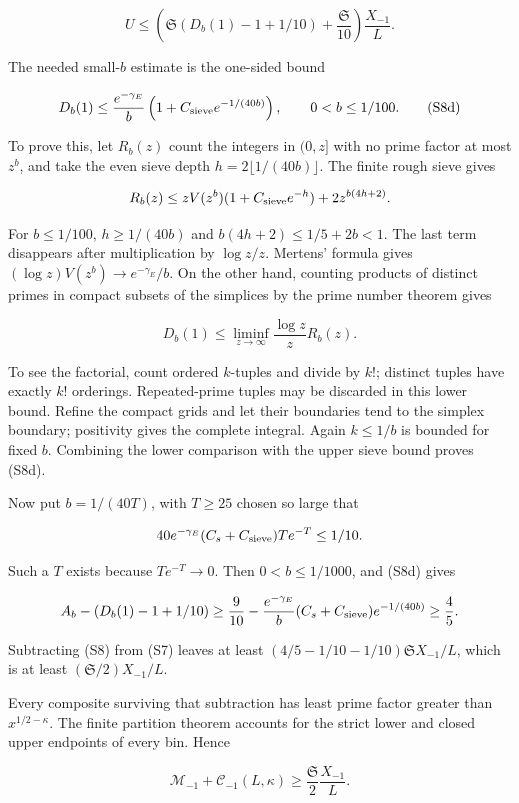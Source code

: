 \[
U\le\left(\mathfrak S(D_b(1)-1+1/10)
                   +\frac{\mathfrak S}{10}\right)\frac{X_{-1}}L.
\tag{S8}
\]

The needed small-\(b\) estimate is the one-sided bound

\[
D_b(1)\le\frac{e^{-\gamma_E}}b
 \left(1+C_{\rm sieve}e^{-1/(40b)}\right),\qquad0<b\le1/100.
\tag{S8d}
\]

To prove this, let \(R_b(z)\) count the integers in \((0,z]\) with no
prime factor at most \(z^b\), and take the even sieve depth
\(h=2\lfloor1/(40b)\rfloor\). The finite rough sieve gives

\[
R_b(z)\le zV(z^b)(1+C_{\rm sieve}e^{-h})
                 +2z^{b(4h+2)}.
\]

For \(b\le1/100\), \(h\ge1/(40b)\) and \(b(4h+2)\le1/5+2b<1\). The last
term disappears after multiplication by \(\log z/z\). Mertens' formula
gives \((\log z)V(z^b)\to e^{-\gamma_E}/b\). On the other hand, counting
products of distinct primes in compact subsets of the simplices by the
prime number theorem gives

\[
D_b(1)\le\liminf_{z\to\infty}\frac{\log z}{z}R_b(z).
\]

To see the factorial, count ordered \(k\)-tuples and divide by \(k!\);
distinct tuples have exactly \(k!\) orderings. Repeated-prime tuples may
be discarded in this lower bound. Refine the compact grids and let their
boundaries tend to the simplex boundary; positivity gives the complete
integral. Again \(k\le1/b\) is bounded for fixed \(b\). Combining the
lower comparison with the upper sieve bound proves (S8d).

Now put \(b=1/(40T)\), with \(T\ge25\) chosen so large that

\[
40e^{-\gamma_E}(C_s+C_{\rm sieve})Te^{-T}\le1/10.
\]

Such a \(T\) exists because \(Te^{-T}\to0\). Then \(0<b\le1/1000\), and
(S8d) gives

\[
A_b-(D_b(1)-1+1/10)
\ge\frac9{10}
 -\frac{e^{-\gamma_E}}b(C_s+C_{\rm sieve})e^{-1/(40b)}
\ge\frac45.
\]

Subtracting (S8) from (S7) leaves at least
\((4/5-1/10-1/10)\mathfrak S X_{-1}/L\), which is at least
\((\mathfrak S/2)X_{-1}/L\).

Every composite surviving that subtraction has least prime factor
greater than \(x^{1/2-\kappa}\). The finite partition theorem accounts
for the strict lower and closed upper endpoints of every bin. Hence

\[
\mathcal M_{-1}+\mathcal C_{-1}(L,\kappa)
\ge\frac{\mathfrak S}{2}\frac{X_{-1}}L. \tag{S9}
\]

